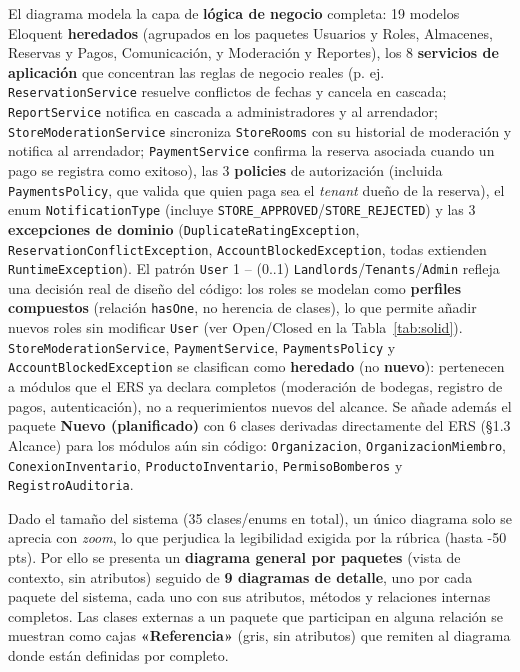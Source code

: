 {\sloppy\noindent El diagrama modela la capa de \textbf{lógica de negocio} completa: 19 modelos Eloquent \textbf{heredados} (agrupados en los paquetes Usuarios y Roles, Almacenes, Reservas y Pagos, Comunicación, y Moderación y Reportes), los 8 \textbf{servicios de aplicación} que concentran las reglas de negocio reales (p. ej. \texttt{ReservationService} resuelve conflictos de fechas y cancela en cascada; \texttt{ReportService} notifica en cascada a administradores y al arrendador; \texttt{StoreModerationService} sincroniza \texttt{StoreRooms} con su historial de moderación y notifica al arrendador; \texttt{PaymentService} confirma la reserva asociada cuando un pago se registra como exitoso), las 3 \textbf{policies} de autorización (incluida \texttt{PaymentsPolicy}, que valida que quien paga sea el \textit{tenant} dueño de la reserva), el enum \texttt{NotificationType} (incluye \texttt{STORE\_APPROVED}/\texttt{STORE\_REJECTED}) y las 3 \textbf{excepciones de dominio} (\texttt{DuplicateRatingException}, \texttt{ReservationConflictException}, \texttt{AccountBlockedException}, todas extienden \texttt{RuntimeException}). El patrón \texttt{User} 1 -- (0..1) \texttt{Landlords}/\texttt{Tenants}/\texttt{Admin} refleja una decisión real de diseño del código: los roles se modelan como \textbf{perfiles compuestos} (relación \texttt{hasOne}, no herencia de clases), lo que permite añadir nuevos roles sin modificar \texttt{User} (ver Open/Closed en la Tabla~\ref{tab:solid}). \texttt{StoreModerationService}, \texttt{PaymentService}, \texttt{PaymentsPolicy} y \texttt{AccountBlockedException} se clasifican como \textbf{heredado} (no \textbf{nuevo}): pertenecen a módulos que el ERS ya declara completos (moderación de bodegas, registro de pagos, autenticación), no a requerimientos nuevos del alcance. Se añade además el paquete \textbf{Nuevo (planificado)} con 6 clases derivadas directamente del ERS (\S1.3 Alcance) para los módulos aún sin código: \texttt{Organizacion}, \texttt{OrganizacionMiembro}, \texttt{ConexionInventario}, \texttt{ProductoInventario}, \texttt{PermisoBomberos} y \texttt{RegistroAuditoria}.\par}

Dado el tamaño del sistema (35 clases/enums en total), un único diagrama solo se aprecia con \textit{zoom}, lo que perjudica la legibilidad exigida por la rúbrica (hasta -50 pts). Por ello se presenta un \textbf{diagrama general por paquetes} (vista de contexto, sin atributos) seguido de \textbf{9 diagramas de detalle}, uno por cada paquete del sistema, cada uno con sus atributos, métodos y relaciones internas completos. Las clases externas a un paquete que participan en alguna relación se muestran como cajas \textbf{«Referencia»} (gris, sin atributos) que remiten al diagrama donde están definidas por completo.

